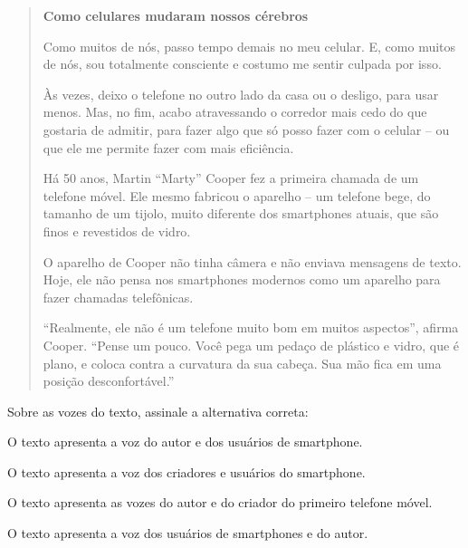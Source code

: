 \begin{quote}

\textbf{Como celulares mudaram nossos cérebros}

Como muitos de nós, passo tempo demais no meu celular. E, como muitos de
nós, sou totalmente consciente e costumo me sentir culpada por isso.

Às vezes, deixo o telefone no outro lado da casa ou o desligo, para usar
menos. Mas, no fim, acabo atravessando o corredor mais cedo do que
gostaria de admitir, para fazer algo que só posso fazer com o celular --
ou que ele me permite fazer com mais eficiência.

Há 50 anos, Martin ``Marty'' Cooper fez a primeira chamada de um
telefone móvel. Ele mesmo fabricou o aparelho -- um telefone bege, do
tamanho de um tijolo, muito diferente dos smartphones atuais, que são
finos e revestidos de vidro.

O aparelho de Cooper não tinha câmera e não enviava mensagens de texto.
Hoje, ele não pensa nos smartphones modernos como um aparelho
para fazer chamadas telefônicas.

``Realmente, ele não é um telefone muito bom em muitos aspectos'',
afirma Cooper. ``Pense um pouco. Você pega um pedaço de plástico e
vidro, que é plano, e coloca contra a curvatura da sua cabeça. Sua mão
fica em uma posição desconfortável.''

\end{quote}


Sobre as vozes do texto, assinale a alternativa correta:

\begin{escolha}
  
  \item O texto apresenta a voz do autor e dos usuários de smartphone.
  
  \item O texto apresenta a voz dos criadores e usuários do smartphone.
  
  \item O texto apresenta as vozes do autor e do criador do primeiro telefone móvel.
  
  \item O texto apresenta a voz dos usuários de smartphones e do autor.

\end{escolha}

